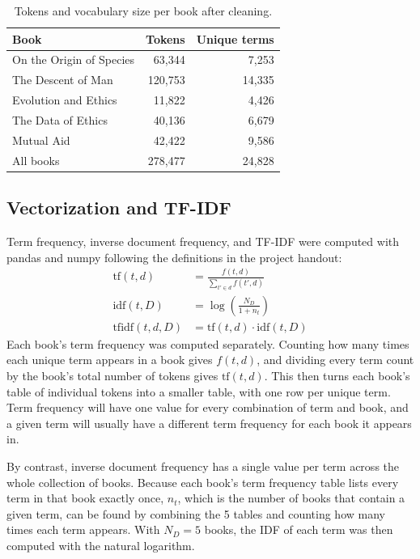 \documentclass[11pt]{article}
\begin{document}
\begin{table}[H]
    \centering
    \begin{tabular}{lrr}
        \toprule
        Book                     & Tokens  & Unique terms \\
        \midrule
        On the Origin of Species & 63,344  & 7,253        \\
        The Descent of Man       & 120,753 & 14,335       \\
        Evolution and Ethics     & 11,822  & 4,426        \\
        The Data of Ethics       & 40,136  & 6,679        \\
        Mutual Aid               & 42,422  & 9,586        \\
        \midrule
        All books                & 278,477 & 24,828       \\
        \bottomrule
    \end{tabular}
    \caption{Tokens and vocabulary size per book after cleaning.}
    \label{tab:tokens}
\end{table}

\subsection{Vectorization and TF-IDF}
\label{sec:tfidf}
Term frequency, inverse document frequency, and TF-IDF were computed with
pandas and numpy following the definitions in the project handout:
\begin{align}
	\mathrm{tf}(t, d)       & = \frac{f(t, d)}{\sum_{t' \in d}{f(t', d)}}  \\
	\mathrm{idf}(t, D)      & = \log\!\left(\frac{N_D}{1 + n_t}\right)     \\
	\mathrm{tfidf}(t, d, D) & = \mathrm{tf}(t, d) \cdot \mathrm{idf}(t, D)
\end{align}
Each book's term frequency was computed separately.
Counting how many times each unique term appears in a book gives $f(t, d)$, and dividing every term count by the book's total number of tokens gives $\mathrm{tf}(t, d)$.
This then turns each book's table of individual tokens into a smaller table, with one row per unique term.
Term frequency will have one value for every combination of term and book, and a given term will usually have a different term frequency for each book it appears in.

By contrast, inverse document frequency has a single value per term across the whole collection of books.
Because each book's term frequency table lists every term in that book exactly once, $n_t$, which is the number of books that contain a given term, can be found by combining the 5 tables and counting how many times each term appears.
With $N_D = 5$ books, the IDF of each term was then computed with the natural logarithm.
\end{document}

